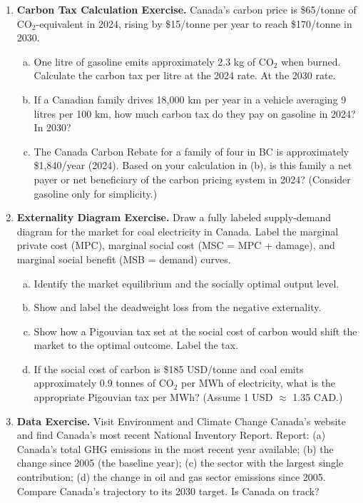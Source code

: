 \begin{enumerate}

\item \textbf{Carbon Tax Calculation Exercise.} Canada's carbon price is \$65/tonne of CO$_2$-equivalent in 2024, rising by \$15/tonne per year to reach \$170/tonne in 2030.
  \begin{enumerate}[(a)]
    \item One litre of gasoline emits approximately 2.3 kg of CO$_2$ when burned. Calculate the carbon tax per litre at the 2024 rate. At the 2030 rate.
    \item If a Canadian family drives 18,000 km per year in a vehicle averaging 9 litres per 100 km, how much carbon tax do they pay on gasoline in 2024? In 2030?
    \item The Canada Carbon Rebate for a family of four in BC is approximately \$1,840/year (2024). Based on your calculation in (b), is this family a net payer or net beneficiary of the carbon pricing system in 2024? (Consider gasoline only for simplicity.)
  \end{enumerate}

\item \textbf{Externality Diagram Exercise.} Draw a fully labeled supply-demand diagram for the market for coal electricity in Canada. Label the marginal private cost (MPC), marginal social cost (MSC = MPC + damage), and marginal social benefit (MSB = demand) curves.
  \begin{enumerate}[(a)]
    \item Identify the market equilibrium and the socially optimal output level.
    \item Show and label the deadweight loss from the negative externality.
    \item Show how a Pigouvian tax set at the social cost of carbon would shift the market to the optimal outcome. Label the tax.
    \item If the social cost of carbon is \$185 USD/tonne and coal emits approximately 0.9 tonnes of CO$_2$ per MWh of electricity, what is the appropriate Pigouvian tax per MWh? (Assume 1 USD $\approx$ 1.35 CAD.)
  \end{enumerate}

\item \textbf{Data Exercise.} Visit Environment and Climate Change Canada's website and find Canada's most recent National Inventory Report. Report: (a) Canada's total GHG emissions in the most recent year available; (b) the change since 2005 (the baseline year); (c) the sector with the largest single contribution; (d) the change in oil and gas sector emissions since 2005. Compare Canada's trajectory to its 2030 target. Is Canada on track?


\end{enumerate}
